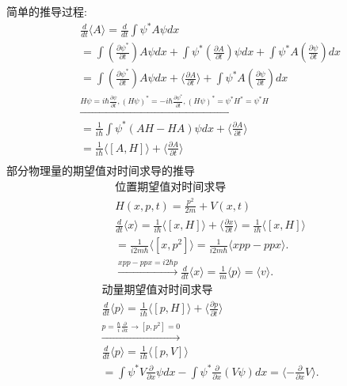 \documentclass[UTF8,a4paper,10pt]{ctexart}
\begin{document}
简单的推导过程:
\begin{equation}
    \begin{aligned}
        &\frac{d}{dt}\langle A \rangle=\frac{d}{dt}\int\psi^{*}A\psi dx\\
        &=\int(\frac{\partial \psi^{*}}{\partial t})A\psi dx+\int\psi^{*}(\frac{\partial A}{\partial t})\psi dx+\int\psi^{*}A(\frac{\partial \psi}{\partial t})dx\\
        &=\int(\frac{\partial \psi^{*}}{\partial t})A\psi dx+\langle\frac{\partial A}{\partial t}\rangle+\int\psi^{*}A(\frac{\partial \psi}{\partial t})dx\\
        &\xrightarrow{H\psi=i\hbar\frac{\partial\psi}{\partial t},(H\psi)^{*}=-i\hbar\frac{\partial\psi^{*}}{\partial t},(H\psi)^{*}=\psi^{*}H^{*}=\psi^{*}H}\\
        &=\frac{1}{i\hbar}\int\psi^{*}(AH-HA)\psi dx+\langle\frac{\partial A}{\partial t}\rangle\\
        &=\frac{1}{i\hbar}\langle[A,H]\rangle+\langle\frac{\partial A}{\partial t}\rangle\\
    \end{aligned}
\end{equation}
\quad \newline
部分物理量的期望值对时间求导的推导
\begin{equation}
    \begin{aligned}
        &\text{位置期望值对时间求导}\\
        &H(x,p,t)=\frac{p^2}{2m}+V(x,t)\\
        &\frac{d}{dt}\langle x\rangle=\frac{1}{i\hbar}\langle[x,H]\rangle+\langle\frac{\partial x}{\partial t}\rangle=\frac{1}{i\hbar}\langle[x,H]\rangle\\
        &=\frac{1}{i2m\hbar}\langle[x,p^2]\rangle=\frac{1}{i2m\hbar}\langle xpp-ppx\rangle.\\
        &\xrightarrow{xpp-ppx=i2\hbar p}\frac{d}{dt}\langle x\rangle=\frac{1}{m}\langle p\rangle=\langle v\rangle.
    \end{aligned}
\end{equation}
\begin{equation}
    \begin{aligned}
        &\text{动量期望值对时间求导}\\
        &\frac{d}{dt}\langle p\rangle=\frac{1}{i\hbar}\langle[p,H]\rangle+\langle\frac{\partial p}{\partial t}\rangle\\
        &\xrightarrow{p=\frac{\hbar}{i}\frac{\partial}{\partial x}\longrightarrow[p,p^2]=0}\\
        &\frac{d}{dt}\langle p\rangle=\frac{1}{i\hbar}\langle[p,V]\rangle\\
        &=\int\psi^{*}V\frac{\partial}{\partial x}\psi dx-\int\psi^{*}\frac{\partial}{\partial x}(V\psi)dx=\langle-\frac{\partial}{\partial x}V\rangle.
    \end{aligned}
\end{equation}
\end{document}
